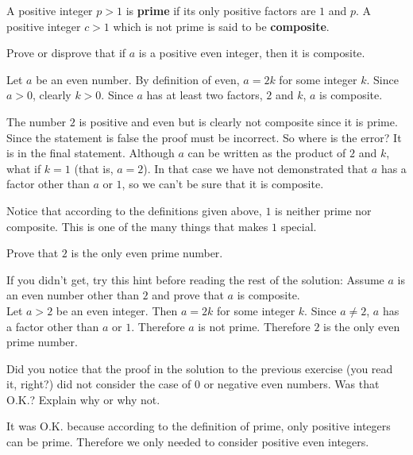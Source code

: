 \begin{df}
A positive integer $p>1$ is {\bf prime} if its only positive factors are $1$ and $p$. 
A positive integer $c>1$ which is not prime is said to be
{\bf composite}.
\end{df}


\begin{eval}
Prove or disprove that if $a$ is a positive even integer, then it is composite.
\begin{spf}
Let $a$ be an even number.  By definition of even, $a=2k$ for some integer $k$.
Since $a>0$, clearly $k>0$.  Since $a$ has at least two factors, $2$ and $k$, $a$ is composite.
\end{spf}
\evallinetwo
\begin{answer}
The number $2$ is positive and even but is clearly not composite since it is prime.  
Since the statement is false the proof must be incorrect.  
So where is the error?  It is in the final statement.  Although $a$ can be written
as the product of $2$ and $k$, what if $k=1$ (that is, $a=2$).  In that case 
we have not demonstrated that $a$ has a factor other than $a$ or $1$, so we can't be sure
that it is composite.
\end{answer}
\end{eval}

\begin{rem}
Notice that according to the definitions given above, $1$ is neither prime nor composite.
This is one of the many things that makes $1$ special.
\end{rem}

\begin{exer}
Prove that $2$ is the only even prime number.\\
\pflinethree
\begin{answer}
If you didn't get, try this hint before reading the rest of the solution:
 Assume $a$ is an even number other than $2$ and prove that $a$ is composite.\\
Let $a>2$ be an even integer.  Then $a=2k$ for some integer $k$.  Since $a\neq 2$, 
$a$ has a factor other than $a$ or $1$.  Therefore $a$ is not prime.
Therefore $2$ is the only even prime number.
\end{answer}
\end{exer}

\begin{ques}
Did you notice that the proof in the solution to the previous exercise (you read it, right?)
did not consider the case of $0$ or negative even numbers.
Was that O.K.? Explain why or why not.\\
\answerline
\begin{answer}
It was O.K. because according to the definition of prime, only positive integers can be prime.
Therefore we only needed to consider positive even integers.
\end{answer}
\end{ques}

